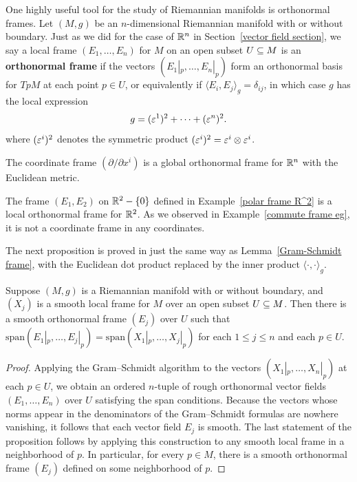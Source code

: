 One highly useful tool for the study of Riemannian manifolds is orthonormal frames. Let $(M,g)$ be an $n$-dimensional Riemannian manifold with or without 
boundary. Just as we did for the case of $\mathbb{R}^n$ in Section~\ref{vector field section}, we say a local frame $(E_1,\dots,E_n)$ for $M$ on an open subset 
$U\subseteq M$ is an \textbf{orthonormal frame} if the vectors $(E_1|_p,\dots,E_n|_p)$ form an orthonormal basis for $TpM$ at each point $p\in U$, or 
equivalently if $\langle E_i,E_j\rangle_g=\delta_{ij}$, in which case $g$ has the local expression
\[g=(\varepsilon^1)^2+\cdots+(\varepsilon^n)^2.\]
where $(\varepsilon^i)^2$ denotes the symmetric product $(\varepsilon^i)^2=\varepsilon^i\otimes\varepsilon^i$.
\begin{example}
The coordinate frame $(\partial/\partial x^i)$ is a global orthonormal frame for $\mathbb{R}^n$
with the Euclidean metric.
\end{example}
\begin{example}
The frame $(E_1,E_2)$ on $\mathbb{R}^2-\{0\}$ defined in Example~\ref{polar frame R^2} is a local orthonormal frame for $\mathbb{R}^2$. As we observed in Example~\ref{commute frame eg}, it is not a coordinate frame in any coordinates.
\end{example}
The next proposition is proved in just the same way as Lemma~\ref{Gram-Schmidt frame}, with the Euclidean dot product replaced by the inner product $\langle\cdot,\cdot\rangle_g$.
\begin{proposition}\label{Gram Schmidt Riemannian}
Suppose $(M,g)$ is a Riemannian manifold with or without boundary, and 
$(X_j)$ is a smooth local frame for $M$ over an open subset $U\subseteq M$. 
Then there is a smooth orthonormal frame $(E_j)$ over $U$ such that 
$\mathrm{span}(E_1|_p,\dots,E_j|_p)=\mathrm{span}(X_1|_p,\dots,X_j|_p)$ for each $1\leq j\leq n$ and each $p\in U$.
\end{proposition}
\begin{proof}
Applying the Gram–Schmidt algorithm to the vectors $(X_1|_p,\dots,X_n|_p)$ at each $p\in U$, we obtain an ordered $n$-tuple of rough orthonormal vector fields 
$(E_1,\dots,E_n)$ over $U$ satisfying the span conditions. Because the vectors whose norms appear in the denominators of the Gram–Schmidt formulas are nowhere 
vanishing, it follows that each vector field $E_j$ is smooth. The last statement of the proposition follows by applying this construction to any smooth local frame in a neighborhood of $p$. 
In particular, for every $p\in M$, there is a smooth orthonormal frame $(E_j)$ defined on some neighborhood of $p$.
\end{proof}
